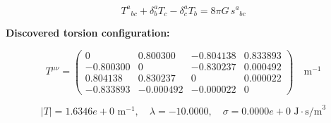 
\begin{equation}
  T^a{}_{bc} + \delta^a_b T_c - \delta^a_c T_b = 8\pi G \, s^a{}_{bc}
\end{equation}

\textbf{Discovered torsion configuration:}

\begin{equation}
  T^{\mu\nu} = \begin{pmatrix}
    0 & 0.800300 & -0.804138 & 0.833893 \\
    -0.800300 & 0 & -0.830237 & 0.000492 \\
    0.804138 & 0.830237 & 0 & 0.000022 \\
    -0.833893 & -0.000492 & -0.000022 & 0
  \end{pmatrix} \quad \text{m}^{-1}
\end{equation}

\begin{equation}
  |T| = 1.6346e+0 \text{ m}^{-1}, \quad
  \lambda = -10.0000, \quad
  \sigma = 0.0000e+0 \text{ J}\cdot\text{s/m}^3
\end{equation}